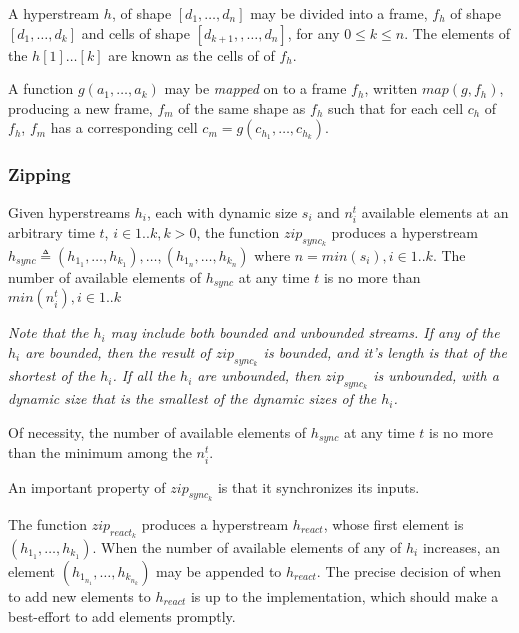 \documentclass{article}
\begin{document}
A hyperstream $h$, of shape $[d_1, \ldots, d_n]$ may be divided into a frame, $f_h$ of shape $[d_1, \ldots, d_k]$ and cells of shape $[d_{k+1}, , \ldots, d_n]$, for any $0 \le k \le n$.
The elements of the $h[1] \ldots [k]$ are known as the cells of of $f_h$.

A function $g(a_1, \ldots, a_k)$ may be {\em mapped} on to a frame $f_h$, written $map(g, f_h)$, producing a new frame, $f_m$ of the same shape as $f_h$ such that for each cell $c_h$ of $f_h$, $f_m$ has a corresponding cell $c_m = g(c_{h_1}, \ldots, c_{h_k})$.

\subsubsection{Zipping}
\label{zipping}

Given hyperstreams $h_i$, each with dynamic size $s_i$ and $n_i^t$  available elements at an arbitrary time $t$, $ i \in 1..k, k > 0$, the function $zip_{sync_k}$ produces a hyperstream 
 \newline
 $h_{sync} \triangleq (h_{1_1}, \ldots, h_{k_1}), \ldots, (h_{1_n}, \ldots, h_{k_n})$ 
 \newline
 where $n = min(s_i), i \in 1..k$.
 The number of available elements of $h_{sync}$ at any time $t$ is no more than $min(n_i^t), i \in 1..k$

{\em
Note that the $h_i$ may include both bounded and unbounded streams. If any of the $h_i$ are bounded, then the result of $zip_{sync_k}$ is bounded, and it's length is that of the shortest of the $h_i$. If all  the $h_i$ are unbounded, then $zip_{sync_k}$ is unbounded, with a dynamic size that is the smallest of the dynamic sizes of the $h_i$.

Of necessity, the number of available elements of $h_{sync}$ at any time $t$ is no more than the minimum among the $n_i^t$.

An important property of $zip_{sync_k}$ is that it synchronizes its inputs.
}

The function $zip_{react_k}$  produces a hyperstream $h_{react}$, whose first element is $(h_{1_1}, \ldots, h_{k_1})$. When the number of available elements of any of $h_i$ increases, an element $(h_{1_{n_1}}, \ldots, h_{k_{n_k}})$ may be appended to $h_{react}$. The precise decision of when to add new elements to $h_{react}$ is up to the
implementation, which should make a best-effort to add elements promptly.
\end{document}
